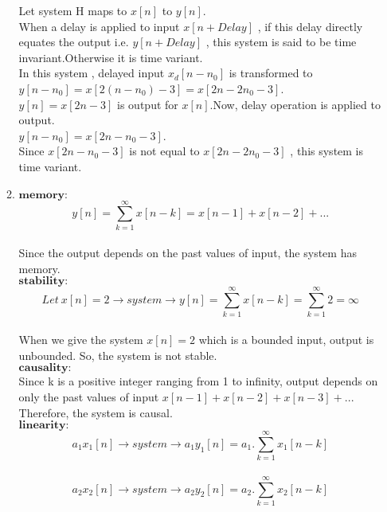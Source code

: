 \documentclass[10pt,a4paper, margin=1in]{article}
\begin{document}
\begin{enumerate}
\begin{enumerate}
 	Let system H maps to $x[n]$ to $y[n]$.\\
 	When a delay is applied to input $x[n+Delay]$ , if this delay directly equates the output i.e.  $y[n+Delay]$ , this system is said to be time invariant.Otherwise it is time variant.\\ 
 	
 	In this system , delayed input $x_d[n-n_0]$ is transformed to $y[n-n_0] = x[2(n-n_0)-3] = x[2n-2n_0-3]$.\\

	$y[n] = x[2n-3]$ is output for $x[n]$.Now, delay operation is applied to output.\\
	
	$y[n-n_0] = x[2n-n_0-3]$.\\
	
	Since $x[2n-n_0-3]$ is not equal to $x[2n-2n_0-3]$ , this system is time variant.\\
     \item %
    $\boldsymbol{memory:}$ \\
    $$y[n] = \sum_{k=1}^{\infty} x[n-k] = x[n-1] + x[n-2] + ...$$ \\
    Since the output depends on the past values of input, the system has memory. \\
    $\boldsymbol{stability:}$ \\
    $$Let \ x[n] = 2 \rightarrow system \rightarrow y[n] = \sum_{k=1}^{\infty} x[n-k] = \sum_{k=1}^{\infty} 2 = \infty$$ \\
    When we give the system $x[n]=2$ which is a bounded input, output is unbounded. So, the system is not stable. \\ 
    $\boldsymbol{causality:}$ \\
    Since k is a positive integer ranging from 1 to infinity, output depends on only the past values of input $x[n-1] + x[n-2] + x[n-3] + ...$ Therefore, the system is causal. \\
    $\boldsymbol{linearity:}$ \\
    $$a_1x_1[n] \rightarrow system \rightarrow a_1y_1[n] = a_1.\sum_{k=1}^{\infty} x_1[n-k]$$ \\
    $$a_2x_2[n] \rightarrow system \rightarrow a_2y_2[n] = a_2.\sum_{k=1}^{\infty} x_2[n-k]$$ \\
    

\end{enumerate}
\end{enumerate}
\end{document}
